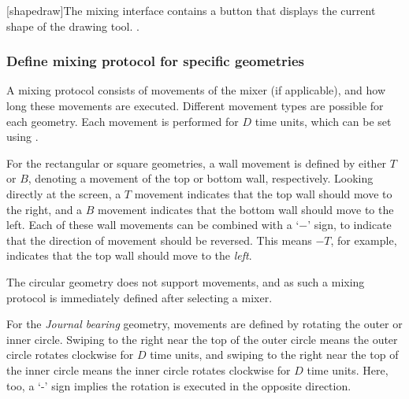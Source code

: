 [shapedraw]{The mixing interface contains a button that displays the current shape of the drawing tool.} %
. %

\subsubsection{Define mixing protocol for specific geometries}
A mixing protocol consists of movements of the mixer (if applicable), and how long these movements are executed. Different movement types are possible for each geometry. Each movement is performed for $D$ time units, which can be set using .

For the rectangular or square geometries, a wall movement is defined by either $T$ or $B$, denoting a movement of the top or bottom wall, respectively. Looking directly at the screen, a $T$ movement indicates that the top wall should move to the right, and a $B$ movement indicates that the bottom wall should move to the left. Each of these wall movements can be combined with a `$-$' sign, to indicate that the direction of movement should be reversed. This means $-T$, for example, indicates that the top wall should move to the \emph{left}.

The circular geometry does not support movements, and as such a mixing protocol is immediately defined after selecting a mixer.

For the \emph{Journal bearing} geometry, movements are defined by rotating the outer or inner circle. Swiping to the right near the top of the outer circle means the outer circle rotates clockwise for $D$ time units, and swiping to the right near the top of the inner circle means the inner circle rotates clockwise for $D$ time units. Here, too, a `-' sign implies the rotation is executed in the opposite direction.


